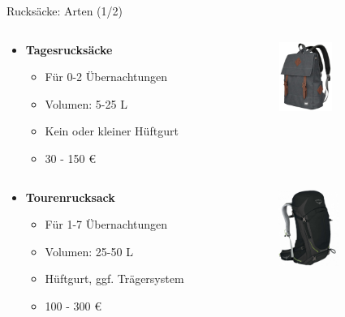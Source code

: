 \documentclass{beamer}
\begin{document}
			\begin{frame}{Rucksäcke: Arten (1/2)}
				\begin{columns}[c]
					\begin{column}{0.64\textwidth}
						\begin{itemize}
							\item \textbf{Tagesrucksäcke}
							\begin{itemize}
								\item Für 0-2 Übernachtungen
								\item Volumen: 5-25 L
								\item Kein oder kleiner Hüftgurt
								\item 30 - 150 €
							\end{itemize}
						\end{itemize}
					\end{column}
					\begin{column}{0.34\textwidth}
						\includegraphics[height=2.25cm]{images/backpack-small.png}
					\end{column}
				\end{columns}
				\vspace{0.4cm}
				\pause
				\begin{columns}[c]
					\begin{column}{0.64\textwidth}
						\begin{itemize}
							\item \textbf{Tourenrucksack}
							\begin{itemize}
								\item Für 1-7 Übernachtungen
								\item Volumen: 25-50 L
								\item Hüftgurt, ggf. Trägersystem
								\item 100 - 300 €
							\end{itemize}
						\end{itemize}
					\end{column}
					\begin{column}{0.34\textwidth}
						\includegraphics[height=2.5cm]{images/backpack-medium.png}
					\end{column}
				\end{columns}
			\end{frame}
				
\end{document}
